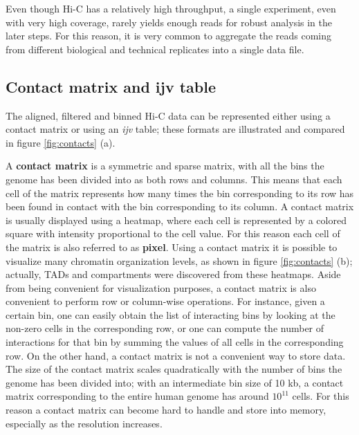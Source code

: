 Even though Hi-C has a relatively high throughput, a single experiment, even with very high coverage, rarely yields enough reads for robust analysis in the later steps. For this reason, it is very common to aggregate the reads coming from different biological and technical replicates into a single data file.

\subsection{Contact matrix and ijv table}

The aligned, filtered and binned Hi-C data can be represented either using a contact matrix or using an \emph{ijv} table; these formats are illustrated and compared in figure \ref{fig:contacts} (a).

A \textbf{contact matrix} is a symmetric and sparse matrix, with all the bins the genome has been divided into as both rows and columns. This means that each cell of the matrix represents how many times the bin corresponding to its row has been found in contact with the bin corresponding to its column. A contact matrix is usually displayed using a heatmap, where each cell is represented by a colored square with intensity proportional to the cell value. For this reason each cell of the matrix is also referred to as \textbf{pixel}. Using a contact matrix it is possible to visualize many chromatin organization levels, as shown in figure \ref{fig:contacts} (b); actually, TADs and compartments were discovered from these heatmaps. Aside from being convenient for visualization purposes, a contact matrix is also convenient to perform row or column-wise operations. For instance, given a certain bin, one can easily obtain the list of interacting bins by looking at the non-zero cells in the corresponding row, or one can compute the number of interactions for that bin by summing the values of all cells in the corresponding row. On the other hand, a contact matrix is not a convenient way to store data. The size of the contact matrix scales quadratically with the number of bins the genome has been divided into; with an intermediate bin size of 10 kb, a contact matrix corresponding to the entire human genome has around $10^{11}$ cells. For this reason a contact matrix can become hard to handle and store into memory, especially as the resolution increases.

